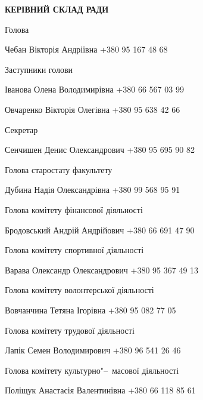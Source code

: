 \documentclass[
	a4paper,
	12pt,
	oneside,
]{extreport}
\begin{document}
\begin{center}\textbf{\Large КЕРІВНИЙ СКЛАД РАДИ}\end{center}
{
\Large

\par\noindent Голова
\par Чебан Вікторія Андріївна {\normalfont\hfill +380 95 167 48 68}

\par\noindent Заступники голови
\par Іванова Олена Володимирівна {\normalfont\hfill +380 66 567 03 99}
\par Овчаренко Вікторія Олегівна {\normalfont\hfill +380 95 638 42 66}

\par\noindent Секретар
\par Сенчишен Денис Олександрович {\normalfont\hfill +380 95 695 90 82}

\bigskip\bigskip

\par\noindent Голова старостату факультету
\par Дубина Надія Олександрівна {\normalfont\hfill +380 99 568 95 91}

\bigskip\bigskip

\par\noindent Голова комітету фінансової діяльності
\par Бродовський Андрій Андрійович {\normalfont\hfill +380 66 691 47 90}

\par\noindent Голова комітету спортивної діяльності
\par Варава Олександр Олександрович {\normalfont\hfill +380 95 367 49 13}

\par\noindent Голова комітету волонтерської діяльності
\par Вовчанчина Тетяна Ігорівна {\normalfont\hfill +380 95 082 77 05}

\par\noindent Голова комітету трудової діяльності
\par Лапік Семен Володимирович {\normalfont\hfill +380 96 541 26 46}

\par\noindent Голова комітету культурно"--~масової діяльності
\par Поліщук Анастасія Валентинівна {\normalfont\hfill +380 66 118 85 61}
\par 
}

\pagebreak
\end{document}
